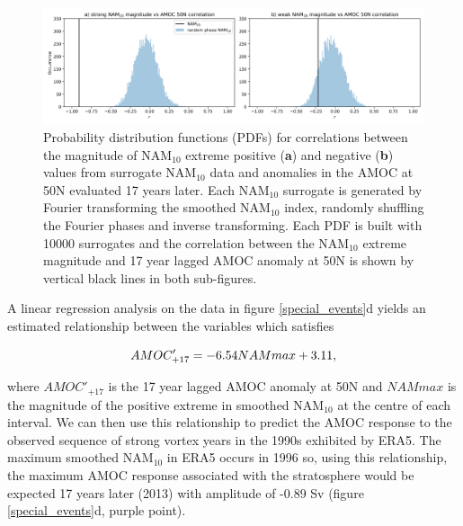 \begin{center}
\begin{figure}[h!]
\noindent\includegraphics[width = \linewidth]{Figures/Figures-surface/correlation_stat_sigs.png}
\caption[PDFs for correlations between the magnitude of NAM$_{10}$ extreme and lagged AMOC]{Probability distribution functions (PDFs) for correlations between the magnitude of NAM$_{10}$ extreme positive (\textbf{a}) and negative (\textbf{b}) values from surrogate NAM$_{10}$ data and anomalies in the AMOC at 50N evaluated 17 years later. Each NAM$_{10}$ surrogate is generated by Fourier transforming the smoothed NAM$_{10}$ index, randomly shuffling the Fourier phases and inverse transforming. Each PDF is built with 10000 surrogates and the correlation between the NAM$_{10}$ extreme magnitude and 17 year lagged AMOC anomaly at 50N is shown by vertical black lines in both sub-figures.}
\label{cors_stat_sigs}
\end{figure}
\end{center}

A linear regression analysis on the data in figure \ref{special_events}d yields an estimated relationship between the variables which satisfies

\begin{equation}
AMOC'_{+17} = -6.54\space NAM max + 3.11,
\end{equation}

where $AMOC'_{+17}$ is the 17 year lagged AMOC anomaly at 50N and $NAM max$ is the magnitude of the positive extreme in smoothed NAM$_{10}$ at the centre of each interval. We can then use this relationship to predict the AMOC response to the observed sequence of strong vortex years in the 1990s exhibited by ERA5. The maximum smoothed NAM$_{10}$ in ERA5 occurs in 1996 so, using this relationship, the maximum AMOC response associated with the stratosphere would be expected 17 years later (2013) with amplitude of -0.89 Sv (figure \ref{special_events}d, purple point).

